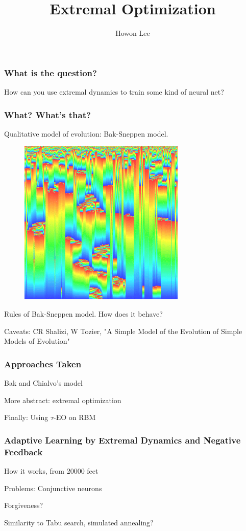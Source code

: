 \documentclass{beamer}
\begin{document}
\title{Extremal Optimization}
\author{Howon Lee}
\maketitle


\begin{frame}
  \frametitle{What is the question?}
  How can you use extremal dynamics to train some kind of neural net?
\end{frame}

\begin{frame}
  \frametitle{What? What's that?}
  Qualitative model of evolution: Bak-Sneppen model.
  \begin{figure}
    \includegraphics{bak_sneppen}
  \end{figure}

  Rules of Bak-Sneppen model. How does it behave?

  Caveats: CR Shalizi, W Tozier, "A Simple Model of the Evolution of Simple Models of Evolution"
\end{frame}

\begin{frame}
  \frametitle{Approaches Taken}
  Bak and Chialvo's model

  More abstract: extremal optimization

  Finally: Using $\tau$-EO on RBM
\end{frame}

\begin{frame}
  \frametitle{Adaptive Learning by Extremal Dynamics and Negative Feedback}
  How it works, from 20000 feet

  Problems: Conjunctive neurons %

  Forgiveness?

  Similarity to Tabu search, simulated annealing?
\end{frame}
\end{document}
